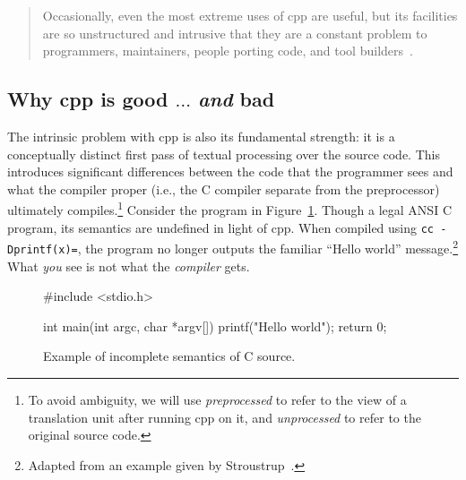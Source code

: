 \documentclass{article}
\newcommand{\Cpp}{\mbox{\textsf{cpp}}}
\newcommand{\C}{\mbox{\textsf{C}}}
\newcommand{\ie}{i.e.,}
\newcommand{\figref}[1]{Figure~\ref{#1}}
\begin{document}
\begin{quotation}
\noindent Occasionally, even the most extreme uses of \Cpp{} are useful, but its
facilities are so unstructured and intrusive that they are a constant
problem to programmers, maintainers, people porting code, and tool
builders~\cite[p.~424]{Stroustrup94}.
\end{quotation}

\subsection{Why \Cpp{} is good $\ldots$ \emph{and} bad}

The intrinsic problem with \Cpp{} is also its fundamental strength: it
is a conceptually distinct first pass of textual processing over the
source code.  This introduces significant differences between the code that the
programmer sees and what the compiler proper (\ie{} the \C{} compiler
separate from the preprocessor) ultimately compiles.\footnote{To avoid
  ambiguity, we will use \emph{preprocessed} to refer to the view of a
  translation unit after running \Cpp{} on it, and \emph{unprocessed} to
  refer to the original source code.} Consider the program in
\figref{fig:badmain}.  Though a legal ANSI \C{} program, its semantics are
undefined in light of \Cpp{}.  When compiled using \texttt{cc
  -Dprintf(x)=}, the program no longer outputs the familiar ``Hello
world'' message.\footnote{Adapted from an example given by
  Stroustrup~\cite[p.~423]{Stroustrup94}.}  What \emph{you} see is not
what the \emph{compiler} gets.


\begin{figure}[hbtp]
\begin{center}
\begin{small}
\begin{pseudocode}[3in]
#include <stdio.h>

int main(int argc, char *argv[]) {
  printf("Hello world");
  return 0;
}
\end{pseudocode}
\end{small}
\caption{Example of incomplete semantics of \C{} source.}
\label{fig:badmain}
\end{center}
\end{figure}
\end{document}
